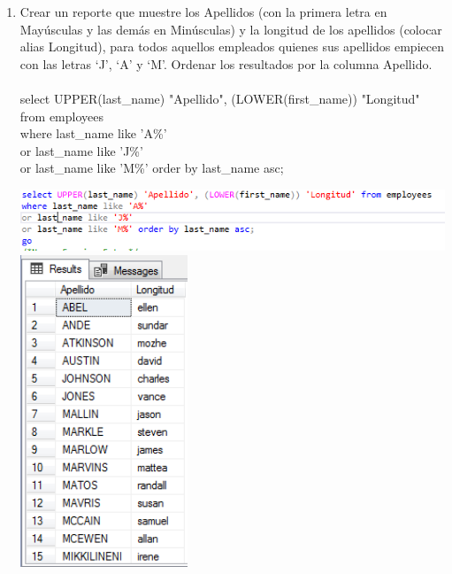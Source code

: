 \begin{enumerate}[1.]
	\item Crear un reporte que muestre los Apellidos (con la primera letra en May\'usculas y las demás en Min\'usculas) y la longitud de los apellidos (colocar alias Longitud), para todos aquellos empleados quienes sus apellidos empiecen con las letras ‘J’, ‘A’ y ‘M’. Ordenar los resultados por la columna Apellido.
	\\
	\\select UPPER(last\_name) "Apellido", (LOWER(first\_name)) "Longitud" 
	\\from employees 
	\\where last\_name like 'A\%'
     	\\ or last\_name like 'J\%'
      	\\or last\_name like 'M\%' order by last\_name asc;
      	\begin{center}
	\includegraphics[width=15cm]{./Imagenes/actividad_05_04a}
	\includegraphics[width=5cm]{./Imagenes/actividad_05_04}
	\end{center}


\end{enumerate}
